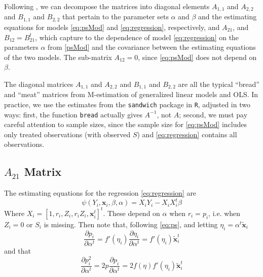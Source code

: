 \documentclass[11pt]{article} %
\begin{document}
Following \citet[][p. 373]{carroletal06}, we %
can decompose the matrices into diagonal elements $A_{1,1}$ and $A_{2,2}$ and $B_{1,1}$ and $B_{2,2}$ that pertain to the parameter sets $\alpha$ and $\beta$ and the estimating equations for models \eqref{eq:psMod} and  \eqref{eq:regression}, respectively, and $A_{21}$, and $B_{12}=B_{21}^t$, which capture to the dependence of model \eqref{eq:regression} on the parameters $\alpha$ from \eqref{psMod} and the covariance between the estimating equations of the two models. The sub-matrix $A_{12}=0$, since \eqref{eq:psMod} does not depend on $\beta$.

The diagonal matrices $A_{1,1}$ and $A_{2,2}$ and $B_{1,1}$ and $B_{2,2}$ are all the typical ``bread'' and ``meat'' matrices from M-estimation of generalized linear models and OLS. In practice, we use the estimates from the \texttt{sandwich} package in \texttt{R}, adjusted in two ways: first, the function \texttt{bread} actually gives $A^{-1}$, not $A$; second, we must pay careful attention to sample sizes, since the sample size for \eqref{eq:psMod} includes only treated observations (with observed $S$) and \eqref{eq:regression} contains all observations.

\subsection{$A_{21}$ Matrix}
The estimating equations for the regression \eqref{eq:regression} are
\begin{equation}\label{eq:eeOLS}
  \psi(Y_i,\bm{x}_i,\beta,\alpha)=X_iY_i-X_iX_i^t\beta
\end{equation}
Where $X_i=[1,r_i,Z_i,r_iZ_i,\bm{x}_i^t]^t$.
These depend on $\alpha$ when $r_i=p_i$, i.e. when $Z_i=0$ or $S_i$ is missing.
Then note that, following \eqref{eq:ps}, and letting $\eta_i=\alpha^t\bm{\tilde{x}}_i$
\begin{equation}\label{eq:derivP}
  \frac{\partial p_i}{\partial \alpha^t}=f'(\eta_i)\frac{\partial \eta_i}{\partial \alpha^t}=f'(\eta_i)\bm{\tilde{x}}_i^t
\end{equation}
and that
\begin{equation}
  \frac{\partial p_i^2}{\partial \alpha^t}=2p\frac{\partial p_i}{\partial \alpha^t}=2f(\eta)f'(\eta_i)\bm{\tilde{x}}_i^t
\end{equation}
\end{document}
